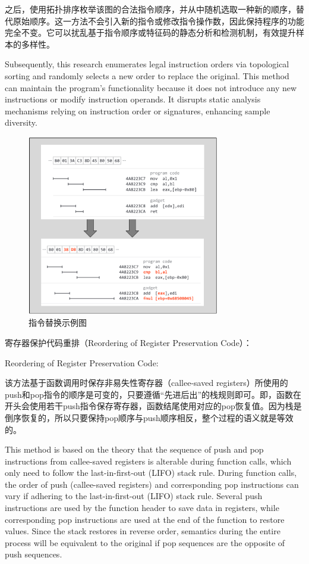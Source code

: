 之后，使用拓扑排序枚举该图的合法指令顺序，并从中随机选取一种新的顺序，替代原始顺序。这一方法不会引入新的指令或修改指令操作数，因此保持程序的功能完全不变。它可以扰乱基于指令顺序或特征码的静态分析和检测机制，有效提升样本的多样性。

Subsequently, this research enumerates legal instruction orders via topological sorting and randomly selects a new order to replace the original. This method can maintain the program's functionality because it does not introduce any new instructions or modify instruction operands. It disrupts static analysis mechanisms relying on instruction order or signatures, enhancing sample diversity.

\begin{figure}[hbt]
	\centering
	\includegraphics[width=0.75\textwidth]{figures/4.2}
	\caption{指令替换示例图}\label{fig:4.2}
\end{figure}

寄存器保护代码重排（Reordering of Register Preservation Code）：

Reordering of Register Preservation Code:

该方法基于函数调用时保存非易失性寄存器（callee-saved registers）所使用的push和pop指令的顺序是可变的，只要遵循“先进后出”的栈规则即可。即，函数在开头会使用若干push指令保存寄存器，函数结尾使用对应的pop恢复值。因为栈是倒序恢复的，所以只要保持pop顺序与push顺序相反，整个过程的语义就是等效的。

This method is based on the theory that the sequence of push and pop instructions from callee-saved registers is alterable during function calls, which only need to follow the last-in-first-out (LIFO) stack rule. During function calls, the order of push (callee-saved registers) and corresponding pop instructions can vary if adhering to the last-in-first-out (LIFO) stack rule. Several push instructions are used by the function header to save data in registers, while corresponding pop instructions are used at the end of the function to restore values. Since the stack restores in reverse order, semantics during the entire process will be equivalent to the original if pop sequences are the opposite of push sequences.

